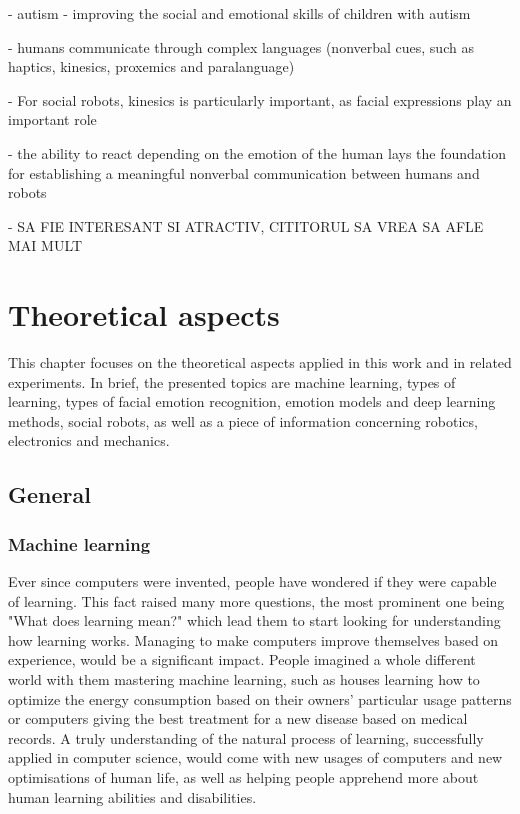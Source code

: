 \documentclass[runningheads,a4paper,12pt]{report}
\begin{document}
- autism - improving the social and emotional skills of children with autism

- humans communicate through complex languages (nonverbal cues, such as haptics, kinesics, proxemics and paralanguage)

- For social robots, kinesics is particularly important, as facial expressions play an important role

- the ability to react depending on the emotion of the human lays the foundation for establishing a meaningful nonverbal communication between humans and robots 

- SA FIE INTERESANT SI ATRACTIV, CITITORUL SA VREA SA AFLE MAI MULT

\chapter{Theoretical aspects}
\label{chapter:theoretical}

This chapter focuses on the theoretical aspects applied in this work and in related experiments. In brief, the presented topics are machine learning, types of learning, types of facial emotion recognition, emotion models and deep learning methods, social robots, as well as a piece of information concerning robotics, electronics and mechanics. 

\section{General}
\label{section:gen}

\subsection{Machine learning}
\label{section:ml}
Ever since computers were invented, people have wondered if they were capable of learning. This fact raised many more questions, the most prominent one being "What does learning mean?" which lead them to start looking for understanding how learning works. Managing to make computers improve themselves based on experience, would be a significant impact. People imagined a whole different world with them mastering machine learning, such as houses learning how to optimize the energy consumption based on their owners' particular usage patterns or computers giving the best treatment for a new disease based on medical records. A truly understanding of the natural process of learning, successfully applied in computer science, would come with new usages of computers and new optimisations of human life, as well as helping people apprehend more about human learning abilities and disabilities. 
\end{document}
